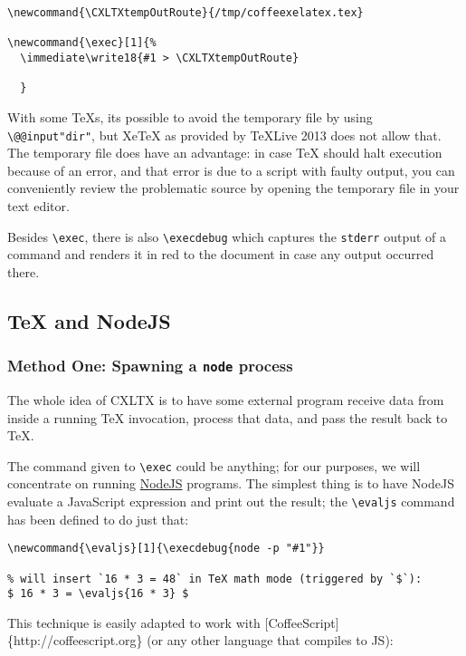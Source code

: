\begin{verbatim}
\newcommand{\CXLTXtempOutRoute}{/tmp/coffeexelatex.tex}

\newcommand{\exec}[1]{%
  \immediate\write18{#1 > \CXLTXtempOutRoute}
  
  }
\end{verbatim}

With some TeXs, its possible to avoid the temporary file by using
\texttt{\textbackslash{}@@input\textbar{}"dir"}, but XeTeX as provided
by TeXLive 2013 does not allow that. The temporary file does have an
advantage: in case TeX should halt execution because of an error, and
that error is due to a script with faulty output, you can conveniently
review the problematic source by opening the temporary file in your text
editor.

Besides \texttt{\textbackslash{}exec}, there is also
\texttt{\textbackslash{}execdebug} which captures the \texttt{stderr}
output of a command and renders it in red to the document in case any
output occurred there.

\subsection{TeX and NodeJS}\label{tex-and-nodejs}

\subsubsection{Method One: Spawning a \texttt{node}
process}\label{method-one-spawning-a-node-process}

The whole idea of CXLTX is to have some external program receive data
from inside a running TeX invocation, process that data, and pass the
result back to TeX.

The command given to \texttt{\textbackslash{}exec} could be anything;
for our purposes, we will concentrate on running
\href{http://nodejs.org}{NodeJS} programs. The simplest thing is to have
NodeJS evaluate a JavaScript expression and print out the result; the
\texttt{\textbackslash{}evaljs} command has been defined to do just
that:

\begin{verbatim}
\newcommand{\evaljs}[1]{\execdebug{node -p "#1"}}

% will insert `16 * 3 = 48` in TeX math mode (triggered by `$`):
$ 16 * 3 = \evaljs{16 * 3} $
\end{verbatim}

This technique is easily adapted to work with
{[}CoffeeScript{]}\{http://coffeescript.org\} (or any other language
that compiles to JS):

